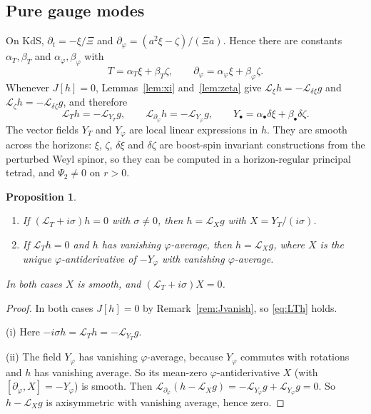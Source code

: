 \documentclass[11pt]{amsart}
\newtheorem{proposition}[theorem]{Proposition}
\theoremstyle{definition}
\theoremstyle{remark}
\numberwithin{equation}{section}
\newcommand{\cL}{\mathcal{L}}
\begin{document}
\subsection{Pure gauge modes}
On KdS, $\partial_t=-\xi/\Xi$ and $\partial_\varphi=(a^2\xi-\zeta)/(\Xi a)$. Hence there are constants $\alpha_T,\beta_T$
and $\alpha_\varphi,\beta_\varphi$ with
\[
T=\alpha_T\xi+\beta_T\zeta,\qquad \partial_\varphi=\alpha_\varphi\xi+\beta_\varphi\zeta.
\]
Whenever $J[h]=0$, Lemmas~\ref{lem:xi} and~\ref{lem:zeta} give $\cL_\xi h=-\cL_{\delta\xi}g$ and
$\cL_\zeta h=-\cL_{\delta\zeta}g$, and therefore
\begin{equation}\label{eq:LTh}
\cL_Th=-\cL_{Y_T}g,\qquad \cL_{\partial_\varphi}h=-\cL_{Y_\varphi}g,\qquad
Y_\bullet=\alpha_\bullet\delta\xi+\beta_\bullet\delta\zeta.
\end{equation}
The vector fields $Y_T$ and $Y_\varphi$ are local linear expressions in $h$. They are smooth across the horizons:
$\xi$, $\zeta$, $\delta\xi$ and $\delta\zeta$ are boost-spin invariant constructions from the perturbed Weyl spinor,
so they can be computed in a horizon-regular principal tetrad, and $\Psi_2\ne0$ on $r>0$.

\begin{proposition}\label{prop:puregauge}
\begin{enumerate}[label=(\roman*)]
\item If $(\cL_T+i\sigma)h=0$ with $\sigma\ne0$, then $h=\cL_Xg$ with $X=Y_T/(i\sigma)$.
\item If $\cL_Th=0$ and $h$ has vanishing $\varphi$-average, then $h=\cL_Xg$, where $X$ is the unique
$\varphi$-antiderivative of $-Y_\varphi$ with vanishing $\varphi$-average.
\end{enumerate}
In both cases $X$ is smooth, and $(\cL_T+i\sigma)X=0$.
\end{proposition}

\begin{proof}
In both cases $J[h]=0$ by Remark~\ref{rem:Jvanish}, so \eqref{eq:LTh} holds.

(i) Here $-i\sigma h=\cL_Th=-\cL_{Y_T}g$.

(ii) The field $Y_\varphi$ has vanishing $\varphi$-average, because $Y_\varphi$ commutes with rotations and $h$ has
vanishing average. So its mean-zero $\varphi$-antiderivative $X$ (with $[\partial_\varphi,X]=-Y_\varphi$) is smooth.
Then $\cL_{\partial_\varphi}(h-\cL_Xg)=-\cL_{Y_\varphi}g+\cL_{Y_\varphi}g=0$. So $h-\cL_Xg$ is axisymmetric with
vanishing average, hence zero.
\end{proof}
\end{document}
